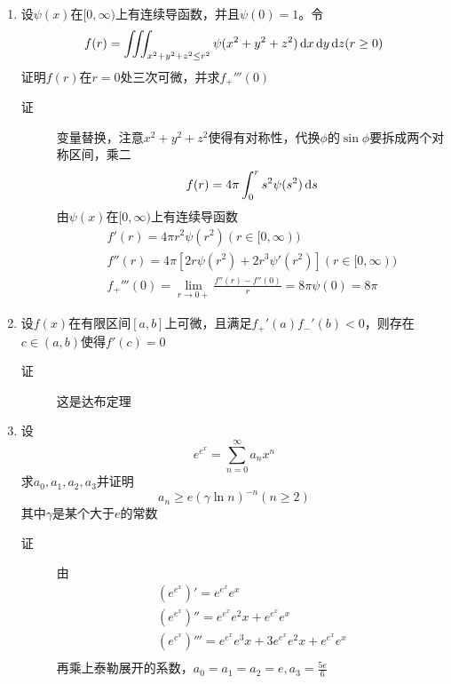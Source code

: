 \begin{enumerate}
\item 设$\psi(x)$在$[0,\infty)$上有连续导函数，并且$\psi(0)=1$。令
\[
f(r)=\iiint_{x^2+y^2+z^2\leq r^2} \psi(x^2+y^2+z^2)\,\mathrm{d} x \,\mathrm{d} y \,\mathrm{d} z (r\geq 0)
\]
证明$f(r)$在$r=0$处三次可微，并求$f_+'''(0)$
\begin{description}
\item[证] 变量替换，注意$x^2+y^2+z^2$使得有对称性，代换$\phi$的$\sin\phi$要拆成两个对称区间，乘二
\[
f(r)=4\pi \int_0^r s^2\psi(s^2)\,\mathrm{d} s
\]
由$\psi(x)$在$[0,\infty)$上有连续导函数
\begin{eqnarray*}
f'(r)=4\pi r^2\psi(r^2) (r\in[0,\infty))\\
f''(r)=4\pi[2r\psi(r^2)+2r^3\psi'(r^2)](r\in[0,\infty))\\
f_+'''(0) = \lim_{r\to0+}\frac{f''(r)-f''(0)}{r} = 8\pi\psi(0)=8\pi
\end{eqnarray*}
\end{description}

\item 设$f(x)$在有限区间$[a,b]$上可微，且满足$f_+'(a)f_-'(b)< 0$，则存在$c\in (a,b)$使得$f'(c)=0$
\begin{description}
\item[证] 这是达布定理
\end{description}


\item 设
\[
e^{e^x} = \sum_{n=0}^{\infty} a_n x^n
\]
求$a_0,a_1,a_2,a_3$并证明
\[
a_n\geq e(\gamma\ln n)^{-n} (n\geq 2)
\]
其中$\gamma$是某个大于$e$的常数
\begin{description}
\item[证] 由
\begin{eqnarray*}
\left(e^{e^x}\right)'= e^{e^x}e^x\\
\left(e^{e^x}\right)''= e^{e^x}e^2x+e^{e^x}e^x\\
\left(e^{e^x}\right)'''= e^{e^x}e^3x+3e^{e^x}e^2x+e^{e^x}e^x\\
\end{eqnarray*}
再乘上泰勒展开的系数，$a_0=a_1=a_2=e,a_3=\frac{5e}{6}$
\end{description}
































\end{enumerate}